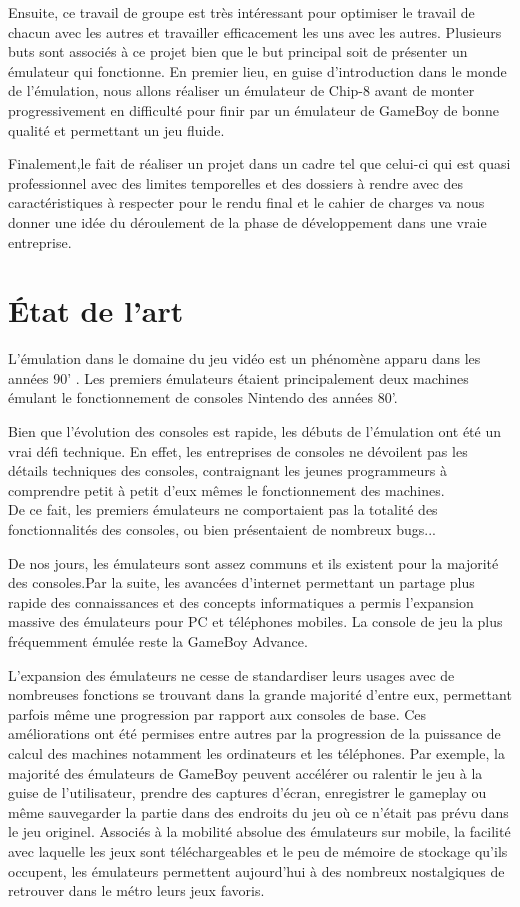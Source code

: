 \documentclass[12pt, a4paper]{article}
\begin{document}
Ensuite, ce travail de groupe est très intéressant pour optimiser le travail de chacun avec les autres et travailler efficacement les uns avec les autres. Plusieurs buts sont associés à ce projet bien que le but principal soit de présenter un émulateur qui fonctionne. 
En premier lieu, en guise d'introduction dans le monde de l'émulation, nous allons réaliser un émulateur de Chip-8 avant de monter progressivement en difficulté pour finir par un émulateur de GameBoy de bonne qualité et permettant un jeu fluide. 
\medskip

Finalement,le fait de réaliser un projet dans un cadre tel que celui-ci qui est quasi professionnel avec des limites temporelles et des dossiers à rendre avec des caractéristiques à respecter pour le rendu final et le cahier de charges va nous donner une idée du déroulement de la phase de développement dans une vraie entreprise.

\pagebreak
\section{État de l'art}
L'émulation dans le domaine du jeu vidéo est un phénomène apparu dans les années 90’ . Les premiers émulateurs étaient principalement deux machines émulant le fonctionnement de consoles Nintendo des années 80’. 
\medskip

Bien que l'évolution des consoles est rapide, les débuts de l'émulation ont été un vrai défi technique. En effet, les entreprises de consoles ne dévoilent pas les détails techniques des consoles, contraignant les jeunes programmeurs à comprendre petit à petit d’eux mêmes le fonctionnement des machines. \\
De ce fait, les premiers émulateurs ne comportaient pas la totalité des fonctionnalités des consoles, ou bien présentaient de nombreux bugs...

\medskip

De nos jours, les émulateurs sont assez communs et ils existent pour la majorité des consoles.Par la suite, les avancées d'internet permettant un partage plus rapide des connaissances et des concepts informatiques a permis l'expansion massive des émulateurs pour PC et téléphones mobiles. La console de jeu la plus fréquemment émulée reste la GameBoy Advance. 

\medskip

L’expansion des émulateurs ne cesse de standardiser leurs usages avec de nombreuses fonctions se trouvant dans la grande majorité d’entre eux, permettant parfois même une progression par rapport aux consoles de base. Ces améliorations ont été permises entre autres par la progression de la puissance de calcul des machines notamment les ordinateurs et les téléphones.  Par exemple, la majorité des émulateurs de GameBoy peuvent accélérer ou ralentir le jeu à la guise de l’utilisateur, prendre des captures d’écran, enregistrer le gameplay ou même sauvegarder la partie dans des endroits du jeu où ce n’était pas prévu dans le jeu originel. Associés à la mobilité absolue des émulateurs sur mobile, la facilité avec laquelle les jeux sont téléchargeables et le peu de mémoire de stockage qu’ils occupent, les émulateurs permettent aujourd’hui à des nombreux nostalgiques de retrouver dans le métro leurs jeux favoris.
\end{document}

